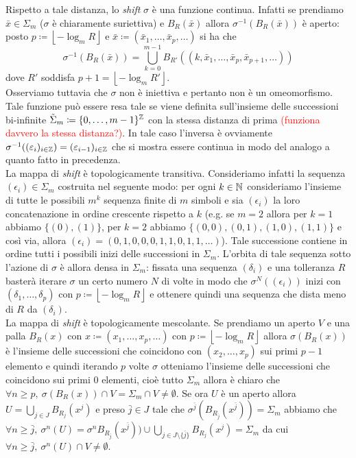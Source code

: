 Rispetto a tale distanza, lo \emph{shift} $ \sigma $ è una funzione continua. Infatti se prendiamo $ \bar{x} \in \Sigma_m $ ($ \sigma $ è chiaramente suriettiva) e $ B_R(\bar{x}) $ allora $ \sigma^{-1}(B_R(\bar{x})) $ è aperto: posto $ p \coloneqq \left \lfloor -\log_m{R} \right \rfloor $ e $ \bar{x} \coloneqq (\bar{x}_1, \ldots, \bar{x}_p, \ldots) $ si ha che 
\[
\sigma^{-1}(B_R(\bar{x})) = \bigcup_{k = 0}^{m-1} B_{R'}((k, \bar{x}_1, \ldots, \bar{x}_p, \bar{x}_{p+1}, \ldots))
\]
dove $ R' $ soddisfa $ p+1 = \left \lfloor -\log_m{R'} \right \rfloor $. \\
Osserviamo tuttavia che $ \sigma $ non è iniettiva e pertanto non è un omeomorfismo. Tale funzione può essere resa tale se viene definita sull'insieme delle successioni bi-infinite $ \tilde{\Sigma}_m \coloneqq \{0, \ldots, m-1\}^{\mathbb{Z}} $ con la stessa distanza di prima \textcolor{red}{(funziona davvero la stessa distanza?)}. In tale caso l'inversa è ovviamente $ \sigma^{-1}((\varepsilon_i)_{i \in \mathbb{Z}}) = (\varepsilon_{i - 1})_{i \in \mathbb{Z}} $ che si mostra essere continua in modo del analogo a quanto fatto in precedenza. \\

La mappa di \emph{shift} è topologicamente transitiva. Consideriamo infatti la sequenza $ (\epsilon_i) \in \Sigma_m $ costruita nel seguente modo: per ogni $ k \in \mathbb{N} $ consideriamo l'insieme di tutte le possibili $ m^k $ sequenza finite di $ m $ simboli e sia $ (\epsilon_i) $ la loro concatenazione in ordine crescente rispetto a $ k $ (e.g. se $ m = 2 $ allora per $ k = 1 $ abbiamo $ \{(0), (1)\} $, per $ k = 2 $ abbiamo $ \{(0, 0), (0, 1), (1, 0), (1, 1)\} $ e così via, allora $ (\epsilon_i) = (0, 1, 0, 0, 0, 1, 1, 0, 1, 1, \ldots) $). Tale successione contiene in ordine tutti i possibili inizi delle successioni in $ \Sigma_m $. L'orbita di tale sequenza sotto l'azione di $ \sigma $ è allora densa in $ \Sigma_m $: fissata una sequenza $ (\delta_i) $ e una tolleranza $ R $ basterà iterare $ \sigma $ un certo numero $ N $ di volte in modo che $ \sigma^N((\epsilon_i)) $ inizi con $ (\delta_1, \ldots, \delta_p) $ con $ p \coloneqq \left \lfloor -\log_m{R} \right \rfloor $ e ottenere quindi una sequenza che dista meno di $ R $ da $ (\delta_i) $. \\

La mappa di \emph{shift} è topologicamente mescolante. Se prendiamo un aperto $ V $ e una palla $ B_R(x) $ con $ x \coloneqq (x_1, \dots, x_p, \ldots) $ con $ p \coloneqq \left \lfloor -\log_m{R} \right \rfloor $ allora $ \sigma(B_R(x)) $ è l'insieme delle successioni che coincidono con $ (x_2, \ldots, x_p) $ sui primi $ p-1 $ elemento e quindi iterando $ p $ volte $ \sigma $ otteniamo l'insieme delle successioni che coincidono sui primi 0 elementi, cioè tutto $ \Sigma_m $ allora è chiaro che $ \forall n \geq p, \ \sigma(B_R(x)) \cap V = \Sigma_m \cap V \neq \emptyset $. Se ora $ U $ è un aperto allora $ U = \bigcup_{j \in J} B_{R_j}(x^j) $ e preso $ \bar{j} \in J $ tale che $ \sigma^{\bar{j}}(B_{R_{\bar{j}}}(x^{\bar{j}})) = \Sigma_m $ abbiamo che $ \forall n \geq \bar{j}, \ \sigma^n(U) = \sigma^n B_{R_{\bar{j}}} (x^{\bar{j}})) \cup \bigcup_{j \in J\setminus\{\bar{j}\}} B_{R_j}(x^j) = \Sigma_m $ da cui $ \forall n \geq \bar{j}, \ \sigma^n(U) \cap V \neq \emptyset $. 

